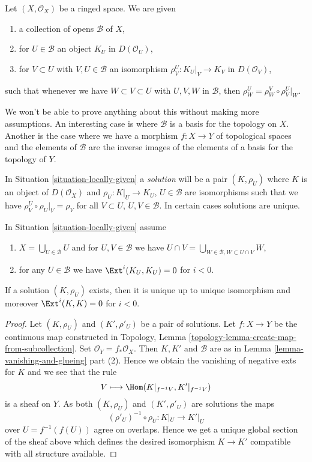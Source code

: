 \begin{situation}
\label{situation-locally-given}
Let $(X, \mathcal{O}_X)$ be a ringed space. We are given
\begin{enumerate}
\item a collection of opens $\mathcal{B}$ of $X$,
\item for $U \in \mathcal{B}$ an object $K_U$ in $D(\mathcal{O}_U)$,
\item for $V \subset U$ with $V, U \in \mathcal{B}$ an isomorphism
$\rho^U_V : K_U|_V \to K_V$ in $D(\mathcal{O}_V)$,
\end{enumerate}
such that whenever we have $W \subset V \subset U$ with $U, V, W$ in
$\mathcal{B}$, then $\rho^U_W = \rho^V_W \circ \rho ^U_V|_W$.
\end{situation}

\noindent
We won't be able to prove anything about this without making more
assumptions. An interesting case is where $\mathcal{B}$ is a basis
for the topology on $X$. Another is the case where we have a morphism
$f : X \to Y$ of topological spaces and the elements of $\mathcal{B}$
are the inverse images of the elements of a basis for the topology of $Y$.

\medskip\noindent
In Situation \ref{situation-locally-given} a {\it solution}
will be a pair $(K, \rho_U)$ where $K$ is an object of $D(\mathcal{O}_X)$
and $\rho_U : K|_U \to K_U$, $U \in \mathcal{B}$
are isomorphisms such that
we have $\rho^U_V \circ \rho_U|_V = \rho_V$ for all $V \subset U$,
$U, V \in \mathcal{B}$. In certain cases solutions are unique.

\begin{lemma}
\label{lemma-uniqueness}
In Situation \ref{situation-locally-given} assume
\begin{enumerate}
\item $X = \bigcup_{U \in \mathcal{B}} U$ and
for $U, V \in \mathcal{B}$ we have
$U \cap V = \bigcup_{W \in \mathcal{B}, W \subset U \cap V} W$,
\item for any $U \in \mathcal{B}$ we have $\Ext^i(K_U, K_U) = 0$
for $i < 0$.
\end{enumerate}
If a solution $(K, \rho_U)$ exists, then it is unique up to unique isomorphism
and moreover $\Ext^i(K, K) = 0$ for $i < 0$.
\end{lemma}

\begin{proof}
Let $(K, \rho_U)$ and $(K', \rho'_U)$ be a pair of solutions.
Let $f : X \to Y$ be the continuous map constructed
in Topology, Lemma \ref{topology-lemma-create-map-from-subcollection}.
Set $\mathcal{O}_Y = f_*\mathcal{O}_X$.
Then $K, K'$ and $\mathcal{B}$ are as in
Lemma \ref{lemma-vanishing-and-glueing} part (2).
Hence we obtain the vanishing of negative exts for $K$ and we see that
the rule
$$
V \longmapsto \Hom(K|_{f^{-1}V}, K'|_{f^{-1}V})
$$
is a sheaf on $Y$. As both $(K, \rho_U)$ and $(K', \rho'_U)$ are solutions
the maps
$$
(\rho'_U)^{-1} \circ \rho_U : K|_U \longrightarrow K'|_U
$$
over $U = f^{-1}(f(U))$ agree on overlaps. Hence we get a unique global
section of the sheaf above which defines the desired isomorphism
$K \to K'$ compatible with all structure available.
\end{proof}

